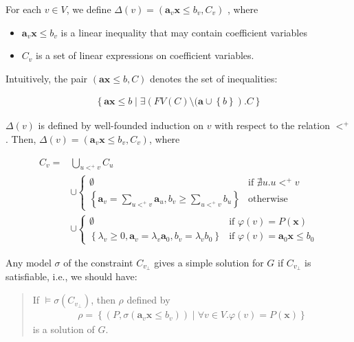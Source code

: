 \documentclass[a4paper,12pt]{article}
\begin{document}
For each $v \in V$, we define
$\Delta(v) = (\mathbf{a}_v \mathbf{x} \leq b_v, C_v)$
, where
\begin{itemize}
\item $\mathbf{a}_v \mathbf{x} \leq b_v$ is a linear inequality that
  may contain coefficient variables
\item $C_v$ is a set of linear expressions on coefficient variables.
\end{itemize}
Intuitively, the pair $(\mathbf{a} \mathbf{x} \leq b, C)$ denotes the
set of inequalities:

\begin{align*}
\left\lbrace
 \mathbf{a} \mathbf{x} \leq b \middle|
 \exists \left( FV(C)
  \setminus (\mathbf{a} \cup \left\lbrace b \right\rbrace
 \right). C
\right\rbrace
\end{align*}

$\Delta(v)$ is defined by well-founded induction on $v$ with respect
to the relation $<^+$. Then,
$\Delta(v) = \left( \mathbf{a}_v \mathbf{x} \leq b_v, C_v \right)$,
where

\begin{align*}
C_v = & \bigcup_{u <^+ v} C_u
\\
& \cup \begin{cases}
\emptyset
& \mbox{if } \nexists u. u <^+ v \\
\left\lbrace
 \mathbf{a}_v = \sum_{u <^+ v} \mathbf{a}_u,
 b_v \geq \sum_{u <^+ v} b_u
\right\rbrace
& \mbox{otherwise}
\end{cases}
\\
& \cup \begin{cases}
\emptyset
& \mbox{if } \varphi(v) = P(\mathbf{x}) \\
\left\lbrace
 \lambda_v \geq 0, \mathbf{a}_v = \lambda_v \mathbf{a}_0,
 b_v = \lambda_v b_0
\right\rbrace
& \mbox{if } \varphi(v) = \mathbf{a}_0 \mathbf{x} \leq b_0
\end{cases}
\end{align*}

Any model $\sigma$ of the constraint $C_{v_\bot}$ gives a simple
solution for $G$ if $C_{v_\bot}$ is satisfiable, i.e., we should have:

\begin{quote}
If $\models \sigma(C_{v_\bot})$, then $\rho$ defined by
\begin{align*}
 \rho = \left\lbrace
  \left( P, \sigma(\mathbf{a}_v \mathbf{x} \leq b_v) \right) \middle|
  \forall v \in V. \varphi(v) = P(\mathbf{x})
 \right\rbrace
\end{align*}
is a solution of $G$.
\end{quote}
\end{document}
